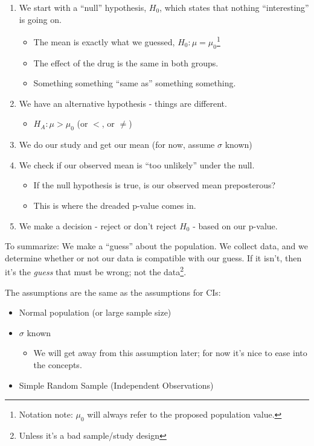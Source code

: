 \documentclass[
  letterpaper,
  DIV=11,
  numbers=noendperiod,
  oneside]{scrreprt}
\providecommand{\tightlist}{%
  \setlength{\itemsep}{0pt}\setlength{\parskip}{0pt}}\usepackage{longtable,booktabs,array}
\begin{document}
\begin{enumerate}
\def\labelenumi{\arabic{enumi}.}
\tightlist
\item
  We start with a ``null'' hypothesis, \(H_0\), which states that
  nothing ``interesting'' is going on.

  \begin{itemize}
  \tightlist
  \item
    The mean is exactly what we guessed, \(H_0: \mu = \mu_0\)\footnote{Notation
      note: \(\mu_0\) will always refer to the proposed population
      value.}
  \item
    The effect of the drug is the same in both groups.
  \item
    Something something ``same as'' something something.
  \end{itemize}
\item
  We have an alternative hypothesis - things are different.

  \begin{itemize}
  \tightlist
  \item
    \(H_A: \mu > \mu_0\) (or \(<\), or \(\ne\))
  \end{itemize}
\item
  We do our study and get our mean (for now, assume \(\sigma\) known)
\item
  We check if our observed mean is ``too unlikely'' under the null.

  \begin{itemize}
  \tightlist
  \item
    If the null hypothesis is true, is our observed mean preposterous?
  \item
    This is where the dreaded p-value comes in.
  \end{itemize}
\item
  We make a decision - reject or don't reject \(H_0\) - based on our
  p-value.
\end{enumerate}

To summarize: We make a ``guess'' about the population. We collect data,
and we determine whether or not our data is compatible with our guess.
If it isn't, then it's the \emph{guess} that must be wrong; not the
data\footnote{Unless it's a bad sample/study design}.

The assumptions are the same as the assumptions for CIs:

\begin{itemize}
\tightlist
\item
  Normal population (or large sample size)
\item
  \(\sigma\) known

  \begin{itemize}
  \tightlist
  \item
    We will get away from this assumption later; for now it's nice to
    ease into the concepts.
  \end{itemize}
\item
  Simple Random Sample (Independent Observations)
\end{itemize}
\end{document}
